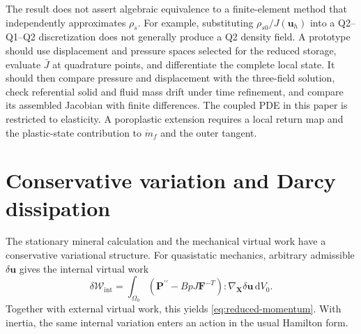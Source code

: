 \documentclass[11pt]{article}
\newcommand{\mbf}[1]{\mathbf{#1}}
\newcommand{\dd}{\,\mathrm d}
\begin{document}
The result does not assert algebraic equivalence to a finite-element method
that independently approximates \(\rho_s\).  For example, substituting
\(\rho_{s0}/J(\mbf u_h)\) into a Q2--Q1--Q2 discretization does not generally
produce a Q2 density field.  A prototype should use displacement and pressure
spaces selected for the reduced storage, evaluate \(\bar J\) at quadrature
points, and differentiate the complete local state.  It should then compare
pressure and displacement with the three-field solution, check referential
solid and fluid mass drift under time refinement, and compare its assembled
Jacobian with finite differences.  The coupled PDE in this paper is restricted
to elasticity.  A poroplastic extension requires a local return map and the
plastic-state contribution to \(\dot m_f\) and the outer tangent.

\section{Conservative variation and Darcy dissipation}
\label{sec:variational-flow}

The stationary mineral calculation and the mechanical virtual work have a
conservative variational structure.  For quasistatic mechanics, arbitrary
admissible \(\delta\mbf u\) gives the internal virtual work
\begin{equation}
 \delta\mathcal W_{\mathrm{int}}
 =\int_{\Omega_0}
 \left(\mbf P^{\prime\prime}-BpJ\mbf F^{-T}\right):
 \nabla_{\mbf X}\delta\mbf u\dd V_0.
 \label{eq:mechanical-virtual-work}
\end{equation}
Together with external virtual work, this yields
\cref{eq:reduced-momentum}.  With inertia, the same internal variation
enters an action in the usual Hamilton form.
\end{document}
